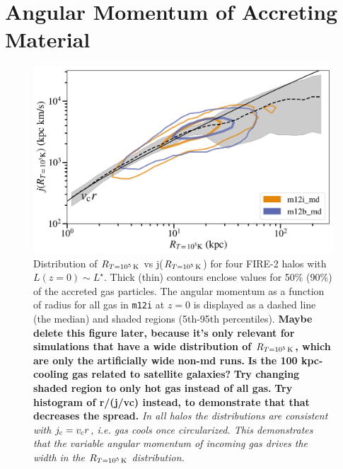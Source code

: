 \documentclass[fleqn,usenatbib]{mnras}
\newcommand{\Rcool}{R_{T=10^5\,{\rm K}}}
\begin{document}






\appendix

\section{Angular Momentum of Accreting Material}

\begin{figure}
    \centering
    \includegraphics[width=\columnwidth]{figures/j_vs_rcondense.png}
    \caption{
    Distribution of $\Rcool$ vs j($\Rcool$) for four FIRE-2 halos with $L(z=0) \sim L^\star$.
Thick (thin) contours enclose values for 50\% (90\%) of the accreted gas particles.
The angular momentum as a function of radius for all gas in \texttt{m12i} at $z=0$ is displayed as a dashed line (the median) and shaded regions (5th-95th percentiles).
\textbf{
Maybe delete this figure later, because it's only relevant for simulations that have a wide distribution of $\Rcool$, which are only the artificially wide non-md runs.
}
\textbf{Is the 100 kpc-cooling gas related to satellite galaxies?}
\textbf{Try changing shaded region to only hot gas instead of all gas.}
\textbf{Try histogram of r/(j/vc) instead, to demonstrate that that decreases the spread.}
\textit{
In all halos the distributions are consistent with $j_{\rm c} = v_{\rm c} r$, i.e. gas cools once circularized.
This demonstrates that the variable angular momentum of incoming gas drives the width in the $\Rcool$ distribution.
}
    }
    \label{f: jcool vs Rcool}
\end{figure}
\end{document}
